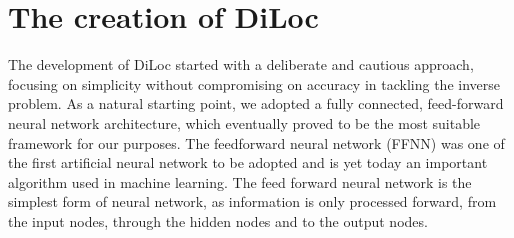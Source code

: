 \documentclass[a4paper, UKenglish, 11pt]{uiomaster}
\begin{document}
%
%
%


\section{The creation of DiLoc}
The development of DiLoc started with a deliberate and cautious approach, focusing on simplicity without compromising on accuracy in tackling the inverse problem. As a natural starting point, we adopted a fully connected, feed-forward neural network architecture, which eventually proved to be the most suitable framework for our purposes. The feedforward neural network (FFNN) was one of the first artificial neural network to be adopted and is yet today an important algorithm used in machine learning. The feed forward neural network is the simplest form of neural network, as information is only processed forward, from the input nodes, through the hidden nodes and to the output nodes.
\end{document}

